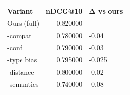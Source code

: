 \begin{tabular}{lrl}
\toprule
Variant & nDCG@10 & Δ vs ours \\
\midrule
Ours (full) & 0.820000 & – \\
-compat & 0.780000 & -0.04 \\
-conf & 0.790000 & -0.03 \\
-type bias & 0.795000 & -0.025 \\
-distance & 0.800000 & -0.02 \\
-semantics & 0.740000 & -0.08 \\
\bottomrule
\end{tabular}
